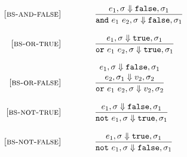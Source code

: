 \documentclass{article}
\begin{document}
\begin{figure}[H]
\[\begin{array}{r@{\qquad\qquad}l}
\bsrule{bs-and-false}{
  \bstep{e_1}{\sigma}{\false}{\sigma_1}
}{
  \bstep{\andE{e_1}{e_2}}{\sigma}{\false}{\sigma_1}
}

\bsrule{bs-or-true}{
  \bstep{e_1}{\sigma}{\true}{\sigma_1} 
}{
  \bstep{\orE{e_1}{e_2}}{\sigma}{\true}{\sigma_1}
}

\bsrule{bs-or-false}{
  \bstep{e_1}{\sigma}{\false}{\sigma_1} \\
  \bstep{e_2}{\sigma_1}{v_2}{\sigma_2}
}{
  \bstep{\orE{e_1}{e_2}}{\sigma}{v_2}{\sigma_2}
}

\bsrule{bs-not-true}{
  \bstep{e_1}{\sigma}{\false}{\sigma_1} 
}{
  \bstep{\notE{e_1}}{\sigma}{\true}{\sigma_1}
}

\bsrule{bs-not-false}{
  \bstep{e_1}{\sigma}{\true}{\sigma_1} 
}{
  \bstep{\notE{e_1}}{\sigma}{\false}{\sigma_1}
}



\end{array}
\]
\end{figure}
\end{document}
